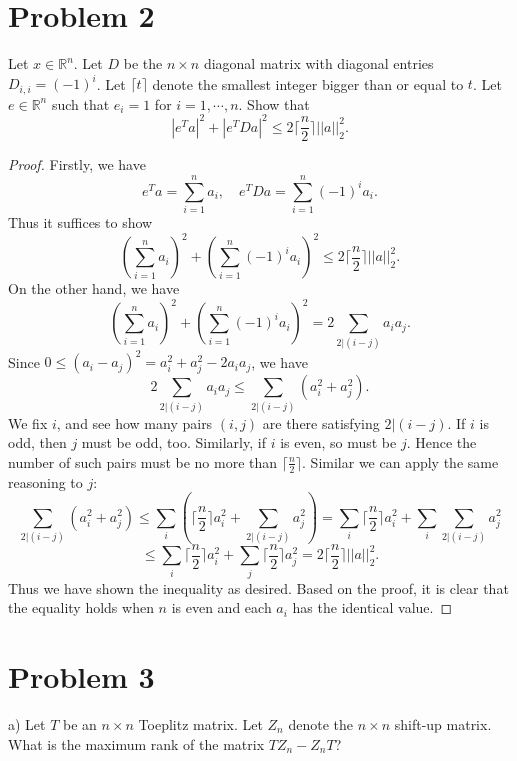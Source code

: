\documentclass[12pt]{article}
\theoremstyle{plain}
\begin{document}
\section{Problem 2}
Let $x\in\mathbb{R}^n$. Let $D$ be the $n\times n$ diagonal matrix with diagonal entries $D_{i,i} = (-1)^i$. Let $\lceil t\rceil$ denote the smallest integer bigger than or equal to $t$. Let $e\in \mathbb{R}^n$ such that $e_i=1$ for $i=1,\cdots,n$. Show that
$$|e^Ta|^2 + |e^T Da|^2 \leq 2 \lceil \frac{n}{2}\rceil ||a||_2^2.$$

\begin{proof}
Firstly, we have
$$e^T a = \sum_{i=1}^n a_i,\quad e^T Da = \sum_{i=1}^n (-1)^i a_i.$$
Thus it suffices to show
$$\left( \sum_{i=1}^n a_i \right)^2 + \left( \sum_{i=1}^n (-1)^i a_i \right)^2 \leq 2 \lceil \frac{n}{2}\rceil ||a||_2^2.$$
On the other hand, we have
$$\left( \sum_{i=1}^n a_i \right)^2 + \left( \sum_{i=1}^n (-1)^i a_i \right)^2
=2\sum_{2|(i-j)}a_ia_j.$$
Since $0\leq (a_i-a_j)^2 = a_i^2 + a_j^2 - 2a_ia_j$, we have
$$2\sum_{2|(i-j)}a_ia_j \leq \sum_{2|(i-j)} (a_i^2 + a_j^2).$$
We fix $i$, and see how many pairs $(i,j)$ are there satisfying $2|(i-j)$. If $i$ is odd, then $j$ must be odd, too. Similarly, if $i$ is even, so must be $j$. Hence the number of such pairs must be no more than $\lceil \frac{n}{2}\rceil$. Similar we can apply the same reasoning to $j$:
$$\sum_{2|(i-j)} (a_i^2 + a_j^2)
\leq \sum_{i} \left( \lceil \frac{n}{2} \rceil a_i^2 + \sum_{2|(i-j)} a_j^2 \right)
= \sum_i \lceil \frac{n}{2} \rceil a_i^2 + \sum_i \sum_{2|(i-j)} a_j^2$$
$$\leq \sum_i \lceil \frac{n}{2} \rceil a_i^2 + \sum_j \lceil \frac{n}{2} \rceil a_j^2
= 2\lceil \frac{n}{2} \rceil ||a||_2^2.$$
Thus we have shown the inequality as desired. Based on the proof, it is clear that the equality holds when $n$ is even and each $a_i$ has the identical value.
\end{proof}

\section{Problem 3}
a) Let $T$ be an $n\times n$ Toeplitz matrix. Let $Z_n$ denote the $n\times n$ shift-up matrix. What is the maximum rank of the matrix $TZ_n - Z_nT$?
\end{document}
